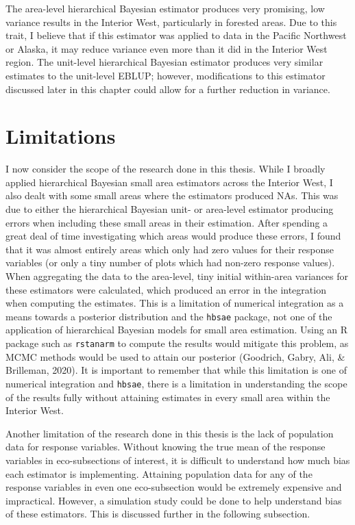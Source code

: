 \documentclass[12pt,twoside]{reedthesis}
\begin{document}
The area-level hierarchical Bayesian estimator produces very promising, low variance results in the Interior West, particularly in forested areas. Due to this trait, I believe that if this estimator was applied to data in the Pacific Northwest or Alaska, it may reduce variance even more than it did in the Interior West region. The unit-level hierarchical Bayesian estimator produces very similar estimates to the unit-level EBLUP; however, modifications to this estimator discussed later in this chapter could allow for a further reduction in variance.
\clearpage

\hypertarget{limitations}{%
\section{Limitations}\label{limitations}}

I now consider the scope of the research done in this thesis. While I broadly applied hierarchical Bayesian small area estimators across the Interior West, I also dealt with some small areas where the estimators produced NAs. This was due to either the hierarchical Bayesian unit- or area-level estimator producing errors when including these small areas in their estimation. After spending a great deal of time investigating which areas would produce these errors, I found that it was almost entirely areas which only had zero values for their response variables (or only a tiny number of plots which had non-zero response values). When aggregating the data to the area-level, tiny initial within-area variances for these estimators were calculated, which produced an error in the integration when computing the estimates. This is a limitation of numerical integration as a means towards a posterior distribution and the \texttt{hbsae} package, not one of the application of hierarchical Bayesian models for small area estimation. Using an R package such as \texttt{rstanarm} to compute the results would mitigate this problem, as MCMC methods would be used to attain our posterior (Goodrich, Gabry, Ali, \& Brilleman, 2020). It is important to remember that while this limitation is one of numerical integration and \texttt{hbsae}, there is a limitation in understanding the scope of the results fully without attaining estimates in every small area within the Interior West.

Another limitation of the research done in this thesis is the lack of population data for response variables. Without knowing the true mean of the response variables in eco-subsections of interest, it is difficult to understand how much bias each estimator is implementing. Attaining population data for any of the response variables in even one eco-subsection would be extremely expensive and impractical. However, a simulation study could be done to help understand bias of these estimators. This is discussed further in the following subsection.
\end{document}
